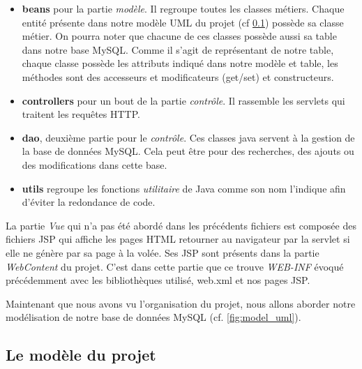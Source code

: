 \documentclass[a4paper]{article}
\begin{document}
\begin{itemize}

\item \textbf{beans} pour la partie \textit{modèle}. Il regroupe toutes les classes métiers. Chaque entité présente dans notre modèle UML du projet (cf \ref{sql_model}) possède sa classe métier. On pourra noter que chacune de ces classes possède aussi sa table dans notre base MySQL. Comme il s'agit de représentant de notre table, chaque classe possède les attributs indiqué dans notre modèle et table, les méthodes sont des accesseurs et modificateurs (get/set) et constructeurs.

\item \textbf{controllers} pour un bout de la partie \textit{contrôle}. Il rassemble les servlets qui traitent les requêtes HTTP.
\item \textbf{dao}, deuxième partie pour le \textit{contrôle}. Ces classes java servent à la gestion de la base de données MySQL. Cela peut être pour des recherches, des ajouts ou des modifications dans cette base.
\item \textbf{utils} regroupe les fonctions \textit{utilitaire} de Java comme son nom l'indique afin d'éviter la redondance de code.

\end{itemize}

La partie \textit{Vue} qui n'a pas été abordé dans les précédents fichiers est composée des fichiers JSP qui affiche les pages HTML retourner au navigateur par la servlet si elle ne génère par sa page à la volée. Ses JSP sont présents dans la partie \textit{WebContent} du projet. C'est dans cette partie que ce trouve \textit{WEB-INF} évoqué précédemment avec les bibliothèques utilisé, web.xml et nos pages JSP.

Maintenant que nous avons vu l'organisation du projet, nous allons aborder notre modélisation de notre base de données MySQL (cf. \ref{fig:model_uml}).

\subsection{Le modèle du projet}
\label{sql_model}
\end{document}
